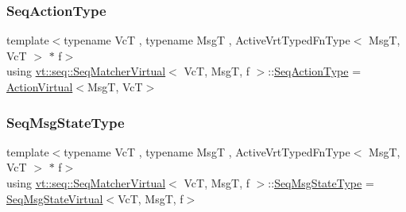 \mbox{\label{structvt_1_1seq_1_1_seq_matcher_virtual_aa53d05ef480fb78161b56db33018b3b0}} 
\subsubsection{\texorpdfstring{Seq\+Action\+Type}{SeqActionType}}
{\footnotesize\ttfamily template$<$typename VcT , typename MsgT , Active\+Vrt\+Typed\+Fn\+Type$<$ Msg\+T, Vc\+T $>$ $\ast$ f$>$ \\
using \hyperlink{structvt_1_1seq_1_1_seq_matcher_virtual}{vt\+::seq\+::\+Seq\+Matcher\+Virtual}$<$ VcT, MsgT, f $>$\+::\hyperlink{structvt_1_1seq_1_1_seq_matcher_virtual_aa53d05ef480fb78161b56db33018b3b0}{Seq\+Action\+Type} =  \hyperlink{structvt_1_1seq_1_1_action_virtual}{Action\+Virtual}$<$MsgT, VcT$>$}

\mbox{\label{structvt_1_1seq_1_1_seq_matcher_virtual_a86488edc14c17416507b49dedef4c54f}} 
\subsubsection{\texorpdfstring{Seq\+Msg\+State\+Type}{SeqMsgStateType}}
{\footnotesize\ttfamily template$<$typename VcT , typename MsgT , Active\+Vrt\+Typed\+Fn\+Type$<$ Msg\+T, Vc\+T $>$ $\ast$ f$>$ \\
using \hyperlink{structvt_1_1seq_1_1_seq_matcher_virtual}{vt\+::seq\+::\+Seq\+Matcher\+Virtual}$<$ VcT, MsgT, f $>$\+::\hyperlink{structvt_1_1seq_1_1_seq_matcher_virtual_a86488edc14c17416507b49dedef4c54f}{Seq\+Msg\+State\+Type} =  \hyperlink{structvt_1_1seq_1_1_seq_msg_state_virtual}{Seq\+Msg\+State\+Virtual}$<$VcT, MsgT, f$>$}

\mbox{\label{structvt_1_1seq_1_1_seq_matcher_virtual_a1ce5abe53e93d69d1b487e97fd30fdbd}} 
